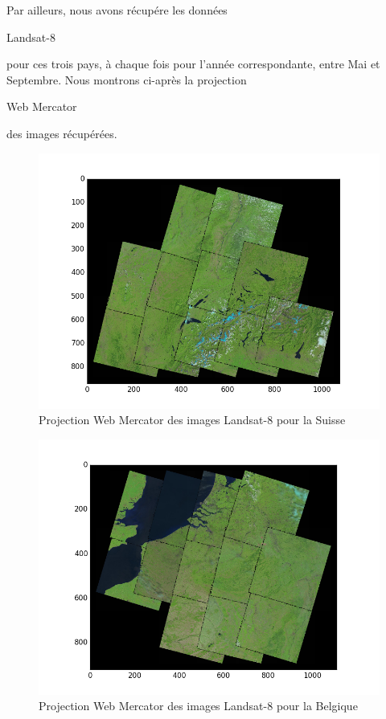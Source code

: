 \documentclass{book}
\begin{document}
   
 Par ailleurs, nous avons récupére les données \begin{itshape}Landsat-8\end{itshape} pour ces trois pays, à chaque fois pour l'année correspondante, entre Mai et Septembre. Nous montrons ci-après
 la projection \begin{itshape}Web Mercator\end{itshape} des images récupérées.
 
 \begin{figure}[H]
 \begin{center}
 \includegraphics[scale=0.60]{../../data/Suisse/covering-selection.png}
 \caption{Projection Web Mercator des images Landsat-8 pour la Suisse}
\label{suisse_landsat}
\end{center}
\end{figure}

 \begin{figure}[H]
 \begin{center}
 \includegraphics[scale=0.60]{../../data/Belgique/covering-selection.png}
 \caption{Projection Web Mercator des images Landsat-8 pour la Belgique}
\label{belgique_landsat}
\end{center}
\end{figure}
\end{document}
